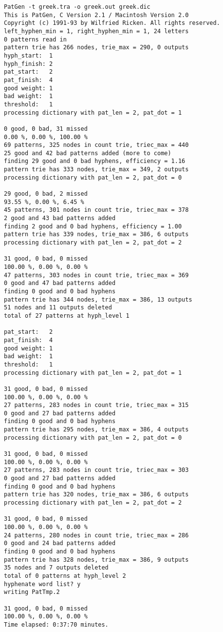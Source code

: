 \begin{verbatim}
PatGen -t greek.tra -o greek.out greek.dic
This is PatGen, C Version 2.1 / Macintosh Version 2.0
Copyright (c) 1991-93 by Wilfried Ricken. All rights reserved.
left_hyphen_min = 1, right_hyphen_min = 1, 24 letters
0 patterns read in
pattern trie has 266 nodes, trie_max = 290, 0 outputs
hyph_start:  1
hyph_finish: 2
pat_start:   2
pat_finish:  4
good weight: 1
bad weight:  1
threshold:   1
processing dictionary with pat_len = 2, pat_dot = 1

0 good, 0 bad, 31 missed
0.00 %, 0.00 %, 100.00 %
69 patterns, 325 nodes in count trie, triec_max = 440
25 good and 42 bad patterns added (more to come)
finding 29 good and 0 bad hyphens, efficiency = 1.16
pattern trie has 333 nodes, trie_max = 349, 2 outputs
processing dictionary with pat_len = 2, pat_dot = 0

29 good, 0 bad, 2 missed
93.55 %, 0.00 %, 6.45 %
45 patterns, 301 nodes in count trie, triec_max = 378
2 good and 43 bad patterns added
finding 2 good and 0 bad hyphens, efficiency = 1.00
pattern trie has 339 nodes, trie_max = 386, 6 outputs
processing dictionary with pat_len = 2, pat_dot = 2

31 good, 0 bad, 0 missed
100.00 %, 0.00 %, 0.00 %
47 patterns, 303 nodes in count trie, triec_max = 369
0 good and 47 bad patterns added
finding 0 good and 0 bad hyphens
pattern trie has 344 nodes, trie_max = 386, 13 outputs
51 nodes and 11 outputs deleted
total of 27 patterns at hyph_level 1

pat_start:   2
pat_finish:  4
good weight: 1
bad weight:  1
threshold:   1
processing dictionary with pat_len = 2, pat_dot = 1

31 good, 0 bad, 0 missed
100.00 %, 0.00 %, 0.00 %
27 patterns, 283 nodes in count trie, triec_max = 315
0 good and 27 bad patterns added
finding 0 good and 0 bad hyphens
pattern trie has 295 nodes, trie_max = 386, 4 outputs
processing dictionary with pat_len = 2, pat_dot = 0

31 good, 0 bad, 0 missed
100.00 %, 0.00 %, 0.00 %
27 patterns, 283 nodes in count trie, triec_max = 303
0 good and 27 bad patterns added
finding 0 good and 0 bad hyphens
pattern trie has 320 nodes, trie_max = 386, 6 outputs
processing dictionary with pat_len = 2, pat_dot = 2

31 good, 0 bad, 0 missed
100.00 %, 0.00 %, 0.00 %
24 patterns, 280 nodes in count trie, triec_max = 286
0 good and 24 bad patterns added
finding 0 good and 0 bad hyphens
pattern trie has 328 nodes, trie_max = 386, 9 outputs
35 nodes and 7 outputs deleted
total of 0 patterns at hyph_level 2
hyphenate word list? y
writing PatTmp.2

31 good, 0 bad, 0 missed
100.00 %, 0.00 %, 0.00 %
Time elapsed: 0:37:70 minutes.
\end{verbatim}

